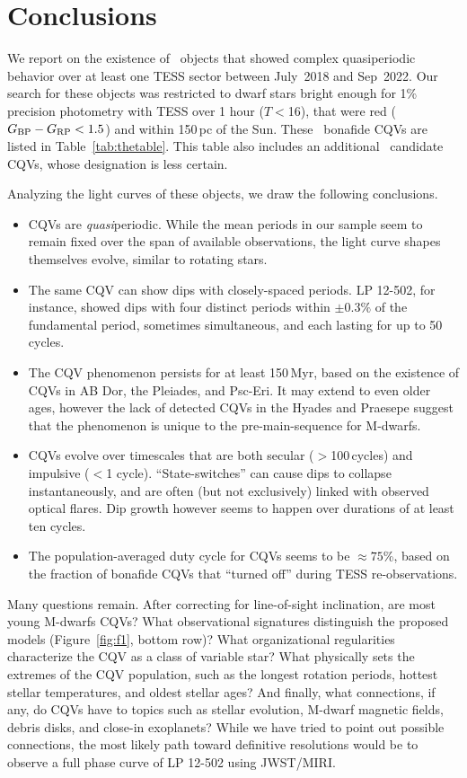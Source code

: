 \documentclass[11pt,twocolumn,tighten]{aastex63}
\newcommand{\bprp}{G_{\rm BP} - G_{\rm RP}}
\begin{document}
\section{Conclusions}
\label{sec:conclusion}

We report on the existence of \ngoods\ objects that showed
complex quasiperiodic behavior over at least one TESS sector between July~2018 and Sep~2022.
Our search for these objects was restricted to dwarf stars bright enough
for 1\% precision photometry with TESS over 1 hour ($T$$<$16),
that were red ($\bprp<1.5$) and within 150\,pc of the Sun.
These \ngoods\ bonafide CQVs are listed in Table~\ref{tab:thetable}.
This table also includes an additional \nmaybes\ candidate CQVs, whose
designation is less certain.

Analyzing the light curves of these objects, we draw the following conclusions.

\begin{itemize}
	\item CQVs are {\it quasi}periodic.  While the mean periods in our
	sample seem to remain fixed over the span of available observations, the light curve
	shapes themselves evolve, similar to rotating stars.
	\item The same CQV can show dips with closely-spaced periods.  
	LP 12-502, for instance, showed dips with four distinct periods within $\pm 0.3\%$
	of the fundamental period, sometimes simultaneous, and each lasting for up to 50 cycles.
	\item The CQV phenomenon persists for at least 150\,Myr, based on the
	existence of CQVs in AB Dor, the Pleiades, and Psc-Eri.  It may extend to
	even older ages, however the lack of detected CQVs in the Hyades and
	Praesepe suggest that the phenomenon is unique to the pre-main-sequence
	for M-dwarfs.
	\item CQVs evolve over timescales that are both secular ($>$100\,cycles) and impulsive ($<$1 cycle).
	``State-switches'' can cause dips to collapse instantaneously, and are often (but not exclusively)
	linked with observed optical flares.
	Dip growth however seems to happen over durations of at least ten cycles.
	\item The population-averaged duty cycle for CQVs seems to be $\approx 75$\%, based on 
	the fraction of bonafide CQVs that ``turned off'' during TESS re-observations.
\end{itemize}

Many questions remain.
After correcting for line-of-sight inclination, are
most young M-dwarfs CQVs?  What observational signatures distinguish
the proposed models (Figure~\ref{fig:f1}, bottom row)?  What
organizational regularities characterize the CQV as a class of
variable star?  What physically sets the extremes of the CQV population, such as
the longest rotation periods, hottest stellar temperatures, and oldest
stellar ages?  And finally, what connections, if any, do CQVs have to
topics such as stellar evolution, M-dwarf magnetic fields, debris
disks, and close-in exoplanets?
While we have tried to point out possible connections, the most
likely path toward definitive resolutions would be to observe a full
phase curve of LP 12-502 using JWST/MIRI.
\end{document}

